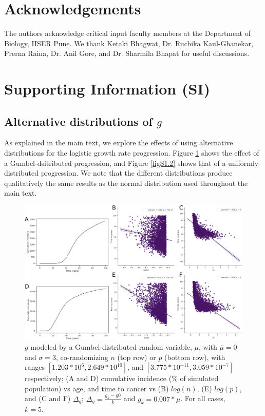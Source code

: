 \documentclass[10pt,twocolumn,twoside]{article}
\begin{document}
\section*{Acknowledgements}
The authors acknowledge critical input faculty members at the Department of Biology, IISER Pune. We thank Ketaki Bhagwat, Dr. Ruchika Kaul-Ghanekar, Prerna Raina, Dr. Anil Gore, and Dr. Sharmila Bhapat for useful discussions.

\newpage
\printbibliography


\section*{Supporting Information (SI)}
	\renewcommand{\thesubsection}{S\arabic{subsection}}
	\setcounter{subsection}{0} 	

	\subsection{Alternative distributions of $g$}\label{S1 Figures}
		As explained in the main text, we explore the effects of using alternative distributions for the logistic growth rate progression. Figure \ref{figS1.1} shows the effect of a Gumbel-dsitributed progression, and Figure \ref{figS1.2} shows that of a uniformly-distributed progression. We note that the different distributions produce qualitatively the same results as the normal distribution used throughout the main text.

		\renewcommand{\thefigure}{S1.\arabic{figure}}
		\setcounter{figure}{0} 	
		\begin{figure}[tbhp]
			\centering
			\includegraphics[width=\linewidth, keepaspectratio=true]{figS1-1.png}
			\caption{$g$ modeled by a Gumbel-distributed random variable, $\mu$, with $\overline{\mu}=0$ and $\sigma=3$, co-randomizing $n$ (top row) or $p$ (bottom row), with ranges $[1.203*10^{6}, 2.649*10^{10}]$, and $[3.775*10^{-11}, 3.059*10^{-7}]$ respectively; (A and D) cumulative incidence (\% of simulated population) vs age, and time to cancer vs (B) $log(n)$, (E) $log(p)$, and (C and F) $\Delta_{g}$; $\Delta_{g} = \frac{g_{k}-g{0}}{k}$ and $g_{k} = 0.007*\mu$. For all cases, $k=5$.}
			\label{figS1.1}
		\end{figure}
\end{document}
